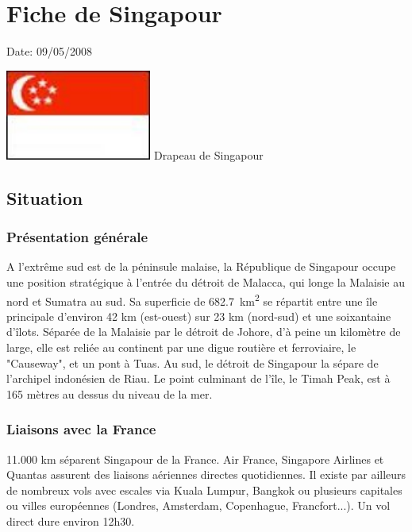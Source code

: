 \section{Fiche de Singapour}

Date: 09/05/2008

\begin{multicols}{2}

\hspace*{-0.65cm}
\includegraphics[width=4.8cm]{articles/Fiche-de-singapour/1210328633arj0.jpg}
Drapeau de Singapour


\subsection{Situation}

\subsubsection{Présentation générale}

A l'extrême sud est de la péninsule malaise, la République de Singapour occupe une position stratégique à l'entrée du détroit de Malacca, qui longe la Malaisie au nord et Sumatra au sud. Sa superficie de \SI{682.7}{km^2} se répartit entre une île principale d'environ 42 km (est-ouest) sur 23 km (nord-sud) et une soixantaine d'îlots. Séparée de la Malaisie par le détroit de Johore, d'à peine un kilomètre de large, elle est reliée au continent par une digue routière et ferroviaire, le "Causeway", et un pont à Tuas. Au sud, le détroit de Singapour la sépare de l'archipel indonésien de Riau. Le point culminant de l'île, le Timah Peak, est à 165 mètres au dessus du niveau de la mer.

\subsubsection{Liaisons avec la France}

11.000 km séparent Singapour de la France. Air France, Singapore Airlines et Quantas assurent des liaisons aériennes directes quotidiennes. Il existe par ailleurs de nombreux vols avec escales via Kuala Lumpur, Bangkok ou plusieurs capitales ou villes européennes (Londres, Amsterdam, Copenhague, Francfort...). Un vol direct dure environ 12h30.


\end{multicols}

